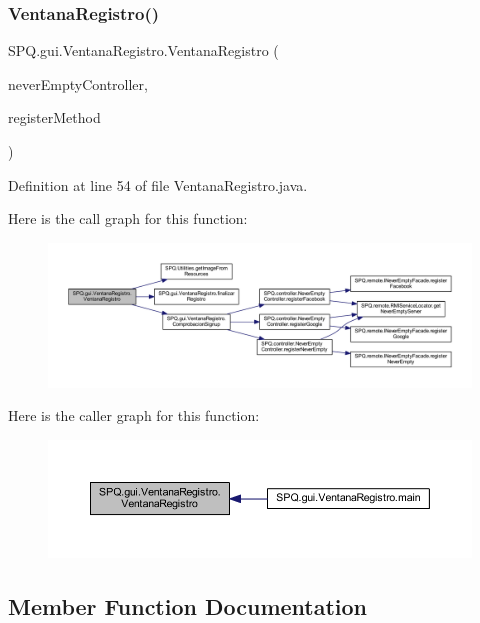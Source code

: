 \subsubsection{\texorpdfstring{Ventana\+Registro()}{VentanaRegistro()}}
{\footnotesize\ttfamily S\+P\+Q.\+gui.\+Ventana\+Registro.\+Ventana\+Registro (\begin{DoxyParamCaption}\item[{\mbox{\hyperlink{class_s_p_q_1_1controller_1_1_never_empty_controller}{Never\+Empty\+Controller}}}]{never\+Empty\+Controller,  }\item[{String}]{register\+Method }\end{DoxyParamCaption})}



Definition at line 54 of file Ventana\+Registro.\+java.

Here is the call graph for this function\+:\nopagebreak
\begin{figure}[H]
\begin{center}
\leavevmode
\includegraphics[width=350pt]{class_s_p_q_1_1gui_1_1_ventana_registro_a40069db92c94222331b181f23744c14f_cgraph}
\end{center}
\end{figure}
Here is the caller graph for this function\+:\nopagebreak
\begin{figure}[H]
\begin{center}
\leavevmode
\includegraphics[width=350pt]{class_s_p_q_1_1gui_1_1_ventana_registro_a40069db92c94222331b181f23744c14f_icgraph}
\end{center}
\end{figure}


\subsection{Member Function Documentation}
\mbox{\label{class_s_p_q_1_1gui_1_1_ventana_registro_a409053f213651ce392699ee8c4f07e66}} 
